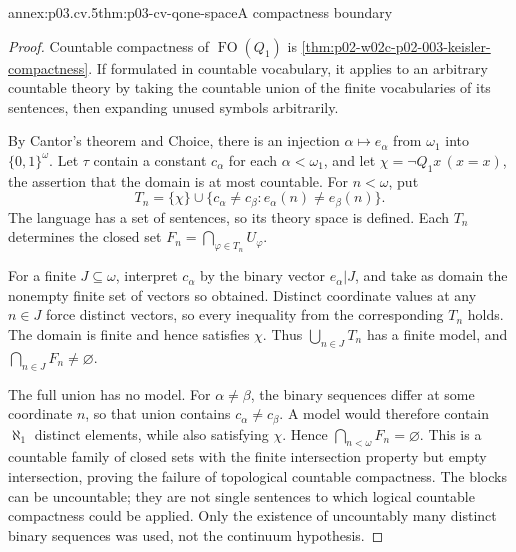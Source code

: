 \begin{annexitem}{annex:p03.cv.5}{thm:p03-cv-qone-space}{A compactness boundary}
\begin{proof}
Countable compactness of \(\operatorname{FO}(Q_1)\) is
\cref{thm:p02-w02c-p02-003-keisler-compactness}. If formulated
in countable vocabulary, it applies to an arbitrary countable
theory by taking the countable union of the finite vocabularies
of its sentences, then expanding unused symbols arbitrarily.

By Cantor's theorem and Choice, there is an injection
\(\alpha\mapsto e_\alpha\) from \(\omega_1\) into
\(\{0,1\}^{\omega}\). Let \(\tau\) contain a constant
\(c_\alpha\) for each \(\alpha<\omega_1\), and let
\(\chi=\neg Q_1x\,(x=x)\), the assertion that the domain
is at most countable. For \(n<\omega\), put
\[
 T_n=\{\chi\}\cup
     \{c_\alpha\ne c_\beta:
                     e_\alpha(n)\ne e_\beta(n)\}.
\]
The language has a set of sentences, so its theory space is defined.
Each \(T_n\) determines the closed set
\(F_n=\bigcap_{\varphi\in T_n}U_\varphi\).

For a finite \(J\subseteq\omega\), interpret \(c_\alpha\)
by the binary vector \(e_\alpha|J\), and take as domain the
nonempty finite set of vectors so obtained. Distinct coordinate
values at any \(n\in J\) force distinct vectors, so every
inequality from the corresponding \(T_n\) holds. The domain
is finite and hence satisfies \(\chi\). Thus
\(\bigcup_{n\in J}T_n\) has a finite model, and
\(\bigcap_{n\in J}F_n\ne\varnothing\).

The full union has no model. For \(\alpha\ne\beta\), the
binary sequences differ at some coordinate \(n\), so that union
contains \(c_\alpha\ne c_\beta\). A model would therefore
contain \(\aleph_1\) distinct elements, while also satisfying
\(\chi\). Hence \(\bigcap_{n<\omega}F_n=\varnothing\).
This is a countable family of closed sets with the finite
intersection property but empty intersection, proving the
failure of topological countable compactness. The blocks can
be uncountable; they are not single sentences to which logical
countable compactness could be applied. Only the existence of
uncountably many distinct binary sequences was used, not the
continuum hypothesis.
\end{proof}
\end{annexitem}
